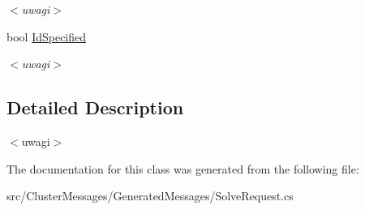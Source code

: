 \begin{DoxyCompactItemize}
\begin{DoxyCompactList}\small\item\em $<$uwagi$>$ \end{DoxyCompactList}\item 
\hypertarget{class_solve_request_ab6cf4376feba6c8ed0b83b28ff99a82e}{}bool \hyperlink{class_solve_request_ab6cf4376feba6c8ed0b83b28ff99a82e}{Id\+Specified}\label{class_solve_request_ab6cf4376feba6c8ed0b83b28ff99a82e}

\begin{DoxyCompactList}\small\item\em $<$uwagi$>$ \end{DoxyCompactList}\end{DoxyCompactItemize}


\subsection{Detailed Description}
$<$uwagi$>$ 

The documentation for this class was generated from the following file\+:\begin{DoxyCompactItemize}
\item 
src/\+Cluster\+Messages/\+Generated\+Messages/Solve\+Request.\+cs\end{DoxyCompactItemize}
